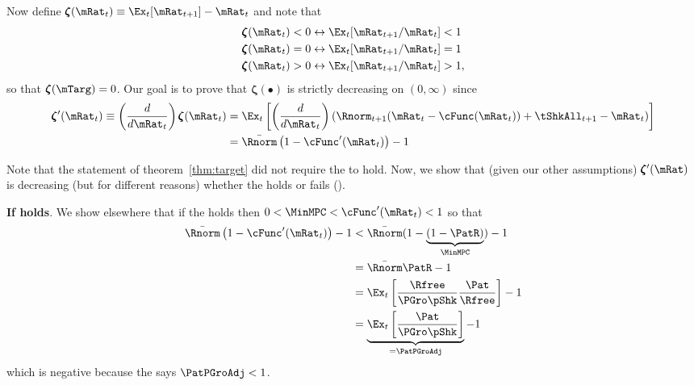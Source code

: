 \documentclass[BufferStockTheory]{subfiles}
\begin{document}
Now define \providecommand{\difFunc}{\pmb{\zeta}} $\difFunc(\mRat_t) \equiv 
\Ex_t[\mRat_{t+1}] - \mRat_t$ and note that
\begin{align}\label{eq:difRatioEquiv}
  \difFunc(\mRat_t) < 0 &\leftrightarrow \Ex_t[{\mRat}_{t+1}/\mRat_t] < 1 
                          \nonumber\\
  \difFunc(\mRat_t) = 0 &\leftrightarrow \Ex_t[{\mRat}_{t+1}/\mRat_t] = 1\\
  \difFunc(\mRat_t) > 0 &\leftrightarrow \Ex_t[{\mRat}_{t+1}/\mRat_t] > 
                          1,\nonumber
\end{align}
so that $\difFunc(\mTarg)=0$. Our goal is to prove that $\difFunc(\bullet)$ is strictly 
decreasing on $(0,\infty)$ since
\begin{align}
  \difFunc^{\prime}(\mRat_{t}) \equiv  \left( \frac{d}{d\mRat_{t}}\right) \difFunc(\mRat_t)  & = \Ex_{t}\left[
                                                                                               \left( \frac{d}{d\mRat_{t}}\right) \left( 
                                                                                               {\Rnorm}_{t+1}(\mRat_{t}-\cFunc(\mRat_{t}))+%
                                                                                               {\tShkAll}_{t+1} - {\mRat}_t\right) \right] \label{eq:difFuncDecreases} \\
                                                                                             & = \bar{\Rnorm}\left(1-\cFunc^{\prime}({\mRat}_t)\right) - 1  \notag
\end{align}

Note that the statement of theorem~\ref{thm:target} did not require the {\RIC} to hold.  Now, we show that (given our other assumptions) $\difFunc^{\prime}(\mRat)$ is decreasing (but for different reasons) whether the {\RIC} holds or fails (\cncl{\RIC}).

\textbf{If {\RIC} holds}.   We show elsewhere that if the {\RIC} holds then $0 < \MinMPC < \cFunc^{\prime}(\mRat_{t}) < 1$ so that 
\begin{align*}
  \bar{\Rnorm}\left(1-\cFunc^{\prime}({\mRat}_t)\right) - 1 & <  \bar{\Rnorm}(1-\underbrace{(1-\PatR)}_{\MinMPC}) - 1  \\
                                                            & = \bar{\Rnorm}\PatR - 1 \\
                                                            & = \Ex_{t}\left[\frac{\Rfree}{\PGro \pShk}\frac{\Pat}{\Rfree}\right] - 1 \\
                                                            & = \underbrace{\Ex_{t}\left[\frac{\Pat}{\PGro \pShk}\right]}_{= \PatPGroAdj} - 1 
\end{align*}
which is negative because the {\GIC} says $\PatPGroAdj < 1$.  
\end{document}
